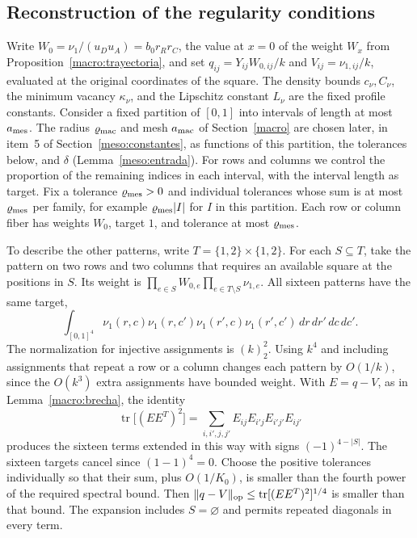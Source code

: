 \subsection{Reconstruction of the regularity conditions}\label{meso:regularidad}
Write $W_0=\nu_1/(u_Du_A)=b_0r_Rr_C$, the value at $x=0$ of the weight $W_x$ from
Proposition~\ref{macro:trayectoria}, and set $q_{ij}=Y_{ij}W_{0,ij}/k$ and $V_{ij}=\nu_{1,ij}/k$, evaluated
at the original coordinates of the square. The density bounds $c_\nu,C_\nu$, the minimum vacancy
$\kappa_\nu$, and the Lipschitz constant $L_\nu$ are the fixed profile constants. Consider a fixed partition
of $[0,1]$ into intervals of length at most $a_{\rm mes}$. The radius $\varrho_{\rm mac}$ and mesh $a_{\rm
mac}$ of Section~\ref{macro} are chosen later, in item~5 of Section~\ref{meso:constantes}, as functions of
this partition, the tolerances below, and $\delta$ (Lemma~\ref{meso:entrada}). For rows and columns we
control the proportion of the remaining indices in each interval, with the interval length as target. Fix a
tolerance $\varrho_{\rm mes}>0$ and individual tolerances whose sum is at most $\varrho_{\rm mes}$ per
family, for example $\varrho_{\rm mes}|I|$ for $I$ in this partition. Each row or column fiber has weights
$W_0$, target $1$, and tolerance at most $\varrho_{\rm mes}$.

To describe the other patterns, write $T=\{1,2\}\times\{1,2\}$. For each $S\subseteq T$, take the pattern on
two rows and two columns that requires an available square at the positions in $S$. Its weight is
$\prod_{e\in S}W_{0,e}\prod_{e\in T\setminus S}\nu_{1,e}$. All sixteen patterns have the same target,
\[
 \int_{[0,1]^4}\nu_1(r,c)\nu_1(r,c')\nu_1(r',c)\nu_1(r',c')\,dr\,dr'\,dc\,dc' .
\]
The normalization for injective assignments is $(k)_2^2$. Using $k^4$ and including assignments that repeat
a row or a column changes each pattern by $O(1/k)$, since the $O(k^3)$ extra assignments have bounded
weight. With $E=q-V$, as in Lemma~\ref{macro:brecha}, the identity
\[
 \operatorname{tr}\big[(EE^{T})^2\big]
 =\sum_{i,i',j,j'} E_{ij}E_{i'j}E_{i'j'}E_{ij'}
\]
produces the sixteen terms extended in this way with signs $(-1)^{4-|S|}$. The sixteen targets cancel since
$(1-1)^4=0$. Choose the positive tolerances individually so that their sum, plus $O(1/K_0)$, is smaller than
the fourth power of the required spectral bound. Then $\|q-V\|_{\rm op}\le\operatorname{tr}[(EE^T)^2]^{1/4}$
is smaller than that bound. The expansion includes $S=\varnothing$ and permits repeated diagonals in every
term.
